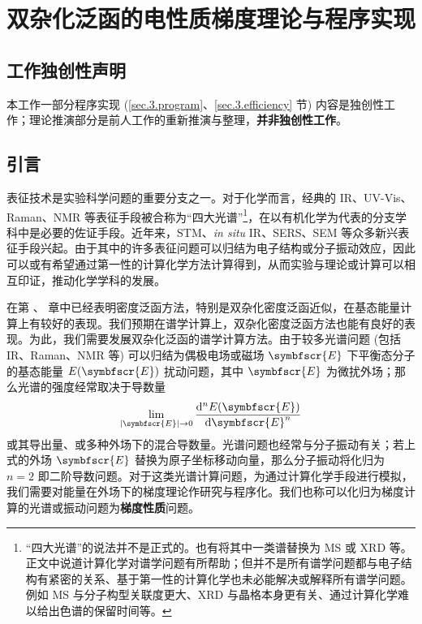 
\chapter{双杂化泛函的电性质梯度理论与程序实现}
\label{sec.3.title}

\section*{工作独创性声明}

本工作一部分程序实现 (\ref{sec.3.program}、\ref{sec.3.efficiency} 节) 内容是独创性工作；理论推演部分是前人工作的重新推演与整理，{\color{red}\textbf{并非独创性工作}}。

\section{引言}

表征技术是实验科学问题的重要分支之一。对于化学而言，经典的 IR、UV-Vis、Raman、NMR 等表征手段被合称为“四大光谱”\footnote{“四大光谱”的说法并不是正式的。也有将其中一类谱替换为 MS 或 XRD 等。正文中说道计算化学对谱学问题有所帮助；但并不是所有谱学问题都与电子结构有紧密的关系、基于第一性的计算化学也未必能解决或解释所有谱学问题。例如 MS 与分子构型关联度更大、XRD 与晶格本身更有关、通过计算化学难以给出色谱的保留时间等。}，在以有机化学为代表的分支学科中是必要的佐证手段。近年来，STM、\emph{in situ} IR、SERS、SEM 等众多新兴表征手段兴起。由于其中的许多表征问题可以归结为电子结构或分子振动效应，因此可以或有希望通过第一性的计算化学方法计算得到，从而实验与理论或计算可以相互印证，推动化学学科的发展。

在第 、 章中已经表明密度泛函方法，特别是双杂化密度泛函近似，在基态能量计算上有较好的表现。我们预期在谱学计算上，双杂化密度泛函方法也能有良好的表现。为此，我们需要发展双杂化泛函的谱学计算方法。由于较多光谱问题 (包括 IR、Raman、NMR 等) 可以归结为偶极电场或磁场 $\symbfscr{E}$ 下平衡态分子的基态能量 $E(\symbfscr{E})$ 扰动问题，其中 $\symbfscr{E}$ 为微扰外场；那么光谱的强度经常取决于导数量
\begin{equation}
    \lim_{|\symbfscr{E}| \rightarrow 0} \frac{\mathrm{d}^n E(\symbfscr{E})}{\mathrm{d} \symbfscr{E}^n}
\end{equation}
或其导出量、或多种外场下的混合导数量。光谱问题也经常与分子振动有关；若上式的外场 $\symbfscr{E}$ 替换为原子坐标移动向量，那么分子振动将化归为 $n = 2$ 即二阶导数问题。对于这类光谱计算问题，为通过计算化学手段进行模拟，我们需要对能量在外场下的梯度理论作研究与程序化。我们也称可以化归为梯度计算的光谱或振动问题为\textbf{梯度性质}问题。

